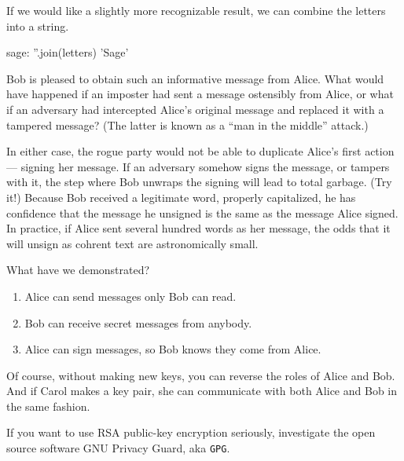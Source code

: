 %
If we would like a slightly more recognizable result, we can combine the letters into a string.
%
\begin{sageexample}
sage: ''.join(letters)
'Sage'
\end{sageexample}
%
Bob is pleased to obtain such an informative message from Alice.  What would have happened if an imposter had sent a message ostensibly from Alice, or what if an adversary had intercepted Alice's original message and replaced it with a tampered message?  (The latter is known as a ``man in the middle'' attack.)\par
%
In either case, the rogue party would not be able to duplicate Alice's first action --- signing her message.  If an adversary somehow signs the message, or tampers with it, the step where Bob unwraps the signing will lead to total garbage.  (Try it!)  Because Bob received a legitimate word, properly capitalized, he has confidence that the message he unsigned is the same as the message Alice signed.  In practice, if Alice sent several hundred words as her message, the odds that it will unsign as cohrent text are astronomically small.\par
%
What have we demonstrated?
%
\begin{enumerate}
\item Alice can send messages only Bob can read.
\item Bob can receive secret messages from anybody.
\item Alice can sign messages, so Bob knows they come from Alice.
\end{enumerate}
%
Of course, without making new keys, you can reverse the roles of Alice and Bob.  And if Carol makes a key pair, she can communicate with both Alice and Bob in the same fashion.\par
%
If you want to use RSA public-key encryption seriously, investigate the open source software GNU Privacy Guard, aka \verb?GPG?.
%
